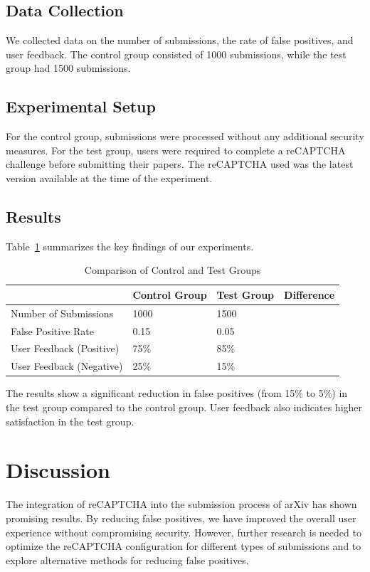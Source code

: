 \documentclass{article}
\begin{document}
\subsection{Data Collection}
We collected data on the number of submissions, the rate of false positives, and user feedback. The control group consisted of 1000 submissions, while the test group had 1500 submissions.

\subsection{Experimental Setup}
For the control group, submissions were processed without any additional security measures. For the test group, users were required to complete a reCAPTCHA challenge before submitting their papers. The reCAPTCHA used was the latest version available at the time of the experiment.

\subsection{Results}
Table~\ref{tab:results} summarizes the key findings of our experiments.

\begin{table}[ht]
\centering
\caption{Comparison of Control and Test Groups}
\label{tab:results}
\begin{tabular}{@{}llll@{}}
\toprule
& \multicolumn{1}{c}{Control Group} & \multicolumn{1}{c}{Test Group} & \multicolumn{1}{c}{Difference} \\ \midrule
Number of Submissions & 1000 & 1500 & \\
False Positive Rate & 0.15 & 0.05 & \\
User Feedback (Positive) & 75\% & 85\% & \\
User Feedback (Negative) & 25\% & 15\% & \\ \bottomrule
\end{tabular}
\end{table}

The results show a significant reduction in false positives (from 15\% to 5\%) in the test group compared to the control group. User feedback also indicates higher satisfaction in the test group.

\section{Discussion}
\label{sec:discussion}
The integration of reCAPTCHA into the submission process of arXiv has shown promising results. By reducing false positives, we have improved the overall user experience without compromising security. However, further research is needed to optimize the reCAPTCHA configuration for different types of submissions and to explore alternative methods for reducing false positives.
\end{document}
